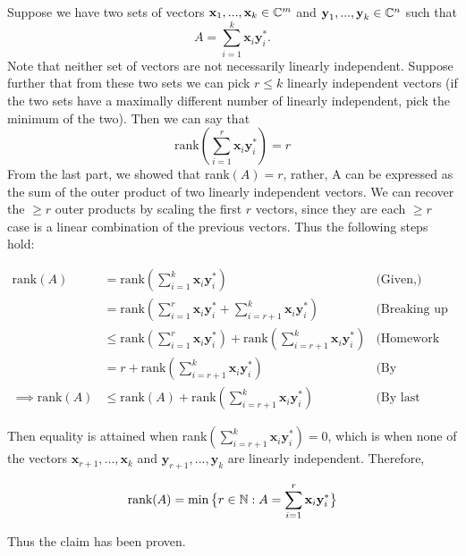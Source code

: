 \partbreak
\begin{solution}

    Suppose we have two sets of vectors $\textbf{x}_1, ..., \textbf{x}_k \in \mathbb{C}^m$ and $\textbf{y}_1, ..., \textbf{y}_k \in \mathbb{C}^n$ such that 
    \[
    A = \sum_{i = 1}^k\textbf{x}_i\textbf{y}_i^*.
    \]
    Note that neither set of vectors are not necessarily linearly independent. Suppose further that from these two sets we can pick $r \leq k$ linearly independent vectors (if the two sets have a maximally different number of linearly independent, pick the minimum of the two). Then we can say that 
    \[
    \text{rank}(\sum_{i = 1}^r \textbf{x}_i\textbf{y}_i^*) = r
    \]
    From the last part, we showed that rank$(A) = r$, rather, A can be expressed as the sum of the outer product of two linearly independent vectors. We can recover the $\geq r$ outer products by scaling the first $r$ vectors, since they are each $\geq r$ case is a linear combination of the previous vectors. Thus the following steps hold:
    
    \newpage
    \alignbreak
    \begin{align}
        \text{rank}(A) &= \text{rank}(\sum_{i = 1}^k \textbf{x}_i\textbf{y}_i^*) &\text{(Given,)}\nonumber\\
        &=\text{rank} (\sum_{i = 1}^r \textbf{x}_i\textbf{y}_i^* + \sum_{i = r+1}^k \textbf{x}_i\textbf{y}_i^*) &\text{(Breaking up summation.)}\nonumber\\
        &\leq \text{rank}(\sum_{i = 1}^r \textbf{x}_i\textbf{y}_i^*) + \text{rank}(\sum_{i = r+1}^k \textbf{x}_i\textbf{y}_i^*) &\text{(Homework 0, problem 1b.)}\nonumber\\
        &= r + \text{rank}(\sum_{i = r+1}^k \textbf{x}_i\textbf{y}_i^*) &\text{(By construction.)}\nonumber\\
        \implies \text{rank}(A) &\leq \text{rank}(A) + \text{rank}(\sum_{i = r+1}^k \textbf{x}_i\textbf{y}_i^*) &\text{(By last part.)}\nonumber
    \end{align}
    \alignbreak

    Then equality is attained when rank$(\sum_{i = r+1}^k \textbf{x}_i\textbf{y}_i^*) = 0$, which is when none of the vectors $\textbf{x}_{r+1}, ..., \textbf{x}_k$ and $\textbf{y}_{r+1}, ..., \textbf{y}_k$ are linearly independent. Therefore, 

    \[
    \text{rank}(A) = \min \big\{ r \in \mathbb{N} : A = \sum_{i = 1}^r \textbf{x}_i\textbf{y}_i^*\big\}
    \]

    Thus the claim has been proven.
\end{solution}

